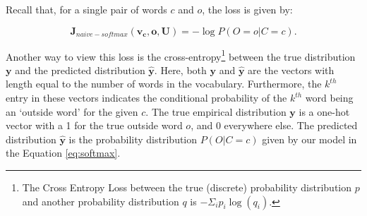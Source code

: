 \documentclass{article}
\begin{document}
	Recall that, for a single pair of words $c$ and $o$, the loss is given by:
	
	\begin{equation}
		\bm{J}_{naive-softmax}\bm{(v_c, o, U)} = -\log{P(O=o|C=c)}.
		\label{eq:naive-softmax}
	\end{equation}
	
	Another way to view this loss is the cross-entropy\footnote{The Cross Entropy Loss between the true (discrete) probability distribution $p$ and another probability distribution $q$ is $-\Sigma_{i} p_i \log{(q_i)}$.} between the true distribution $\bm{y}$ and the predicted distribution $\hat{\bm{y}}$. Here, both $\bm{y}$ and $\bm{\hat{y}}$ are the vectors with length equal to the number of words in the vocabulary. Furthermore, the $k^{th}$ entry in these vectors indicates the conditional probability of the $k^{th}$ word being an `outside word' for the given $c$. The true empirical distribution $\bm{y}$ is a one-hot vector with a 1 for the true outside word $o$, and 0 everywhere else. The predicted distribution $\hat{\bm{y}}$ is the probability distribution $P(O|C=c)$ given by our model in the Equation \ref{eq:softmax}. 
	
\end{document}
